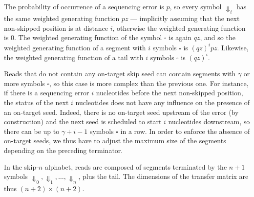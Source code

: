 \documentclass{article}
\begin{document}
The probability of occurrence of a sequencing error is $p$, so every
symbol $\Downarrow_i$ has the same weighted generating function $pz$ ---
implicitly assuming that the next non-skipped position is at distance $i$,
otherwise the weighted generating function is 0. The weighted generating
function of the symbol $\square$ is again $qz$, and so the weighted
generating function of a segment with $i$ symbols $\square$ is $(qz)^ipz$.
Likewise, the weighted generating function of a tail with $i$ symbols
$\square$ is $(qz)^i$.

Reads that do not contain any on-target skip seed can contain segments
with $\gamma$ or more symbols $\square$, so this case is more complex than
the previous one. For instance, if there is a sequencing error $i$
nucleotides before the next non-skipped position, the status of the next
$i$ nucleotides does not have any influence on the presence of an
on-target seed. Indeed, there is no on-target seed upstream of the error
(by construction) and the next seed is scheduled to start $i$ nucleotides
downstream, so there can be up to $\gamma+i-1$ symbols $\square$ in a row.
In order to enforce the absence of on-target seeds, we thus have to adjust
the maximum size of the segments depending on the preceding terminator.

In the skip-$n$ alphabet, reads are composed of segments terminated by the
$n+1$ symbols $\Downarrow_0, \Downarrow_1, \ldots, \Downarrow_n$, plus the
tail. The dimensions of the transfer matrix are thus $(n+2) \times (n+2)$.
\end{document}
